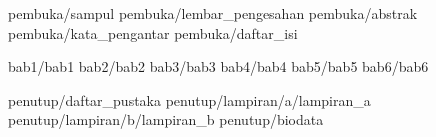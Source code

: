 \documentclass[a5paper, twoside, 11pt, listof=nochaptergap] {book}
\begin{document}

    \pagestyle {normal}

    \frontmatter
     {pembuka/sampul}
     {pembuka/lembar_pengesahan}
     {pembuka/abstrak}
     {pembuka/kata_pengantar}
     {pembuka/daftar_isi}

    \mainmatter
     {bab1/bab1} \cleardoublepage
     {bab2/bab2} \cleardoublepage
     {bab3/bab3} \cleardoublepage
     {bab4/bab4} \cleardoublepage
     {bab5/bab5} \cleardoublepage
     {bab6/bab6} \cleardoublepage

    \backmatter
     {penutup/daftar_pustaka}
     {penutup/lampiran/a/lampiran_a}
     {penutup/lampiran/b/lampiran_b}
     {penutup/biodata}
\end{document}
